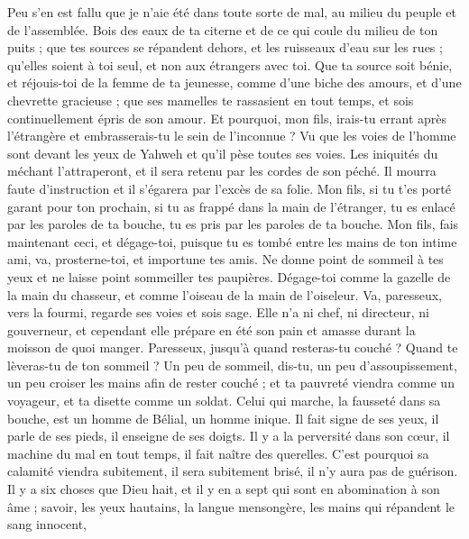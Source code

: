 \begin{multicols}{2}
Peu s'en est fallu que je n'aie été dans toute sorte de mal, au milieu du peuple et de l'assemblée.
Bois des eaux de ta citerne et de ce qui coule du milieu de ton puits ;
que tes sources se répandent dehors, et les ruisseaux d'eau sur les rues ;
qu'elles soient à toi seul, et non aux étrangers avec toi.
Que ta source soit bénie, et réjouis-toi de la femme de ta jeunesse,
comme d'une biche des amours, et d'une chevrette gracieuse ; que ses mamelles te rassasient en tout temps, et sois continuellement épris de son amour.
Et pourquoi, mon fils, irais-tu errant après l'étrangère et embrasserais-tu le sein de l'inconnue ?
Vu que les voies de l'homme sont devant les yeux de Yahweh et qu'il pèse toutes ses voies.
Les iniquités du méchant l'attraperont, et il sera retenu par les cordes de son péché.
Il mourra faute d'instruction et il s'égarera par l'excès de sa folie.
\VerseOne{}Mon fils, si tu t’es porté garant pour ton prochain, si tu as frappé dans la main de l’étranger,
tu es enlacé par les paroles de ta bouche, tu es pris par les paroles de ta bouche.
Mon fils, fais maintenant ceci, et dégage-toi, puisque tu es tombé entre les mains de ton intime ami, va, prosterne-toi, et importune tes amis.
Ne donne point de sommeil à tes yeux et ne laisse point sommeiller tes paupières.
Dégage-toi comme la gazelle de la main du chasseur, et comme l'oiseau de la main de l'oiseleur.
Va, paresseux, vers la fourmi, regarde ses voies et sois sage.
Elle n'a ni chef, ni directeur, ni gouverneur,
et cependant elle prépare en été son pain et amasse durant la moisson de quoi manger.
Paresseux, jusqu'à quand resteras-tu couché ? Quand te lèveras-tu de ton sommeil ?
Un peu de sommeil, dis-tu, un peu d'assoupissement, un peu croiser les mains afin de rester couché ;
et ta pauvreté viendra comme un voyageur, et ta disette comme un soldat.
Celui qui marche, la fausseté dans sa bouche, est un homme de Bélial, un homme inique.
Il fait signe de ses yeux, il parle de ses pieds, il enseigne de ses doigts.
Il y a la perversité dans son cœur, il machine du mal en tout temps, il fait naître des querelles.
C'est pourquoi sa calamité viendra subitement, il sera subitement brisé, il n'y aura pas de guérison.
Il y a six choses que Dieu hait, et il y en a sept qui sont en abomination à son âme ;
savoir, les yeux hautains, la langue mensongère, les mains qui répandent le sang innocent,

\end{multicols}
